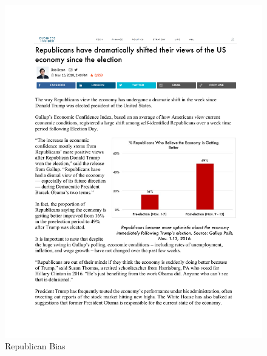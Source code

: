 \documentclass[12pt, letterpaper]{article}
\begin{document}
\begin{figure}[H]
\centering
{}
\caption{Republican Bias}
\includegraphics[width=1.05\textwidth]{../figs/yg_treats/rep_motivate.pdf}
\smallskip
\end{figure}
\end{document}
